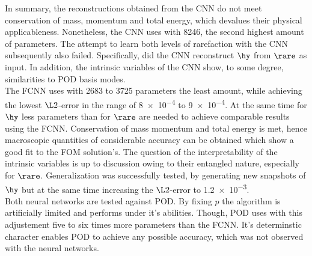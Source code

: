 In summary, the reconstructions obtained from the CNN do not meet conservation of mass, momentum and total energy, which devalues their physical applicableness. Nonetheless, the CNN uses with 8246, the second highest amount of parameters. The attempt to learn both levels of rarefaction with the CNN subsequently also failed. Specifically, did the CNN reconstruct \(\hy\) from \(\rare\) as input. In addition, the intrinsic variables of the CNN show, to some degree, similarities to POD basis modes. \\
The FCNN uses with 2683 to 3725 parameters the least amount, while achieving the lowest \(\L2\)-error in the range of \num{8e-4} to \num{9e-4}. At the same time for \(\hy\) less parameters than for \(\rare\) are needed to achieve comparable results using the FCNN. Conservation of mass momentum and total energy is met, hence macroscopic quantities of considerable accuracy can be obtained which show a good fit to the FOM solution's. The question of the interpretability of the intrinsic variables is up to discussion owing to their entangled nature, especially for \(\rare\). Generalization was successfully tested, by generating new snapshots of \(\hy\) but at the same time increasing the \(\L2\)-error to \num{1.2e-3}.\\
Both neural networks are tested against POD. By fixing \(p\) the algorithm is artificially limited and performs under it's abilities. Though, POD uses with this adjustement five to six times more parameters than the FCNN. It's determinstic character enables POD to achieve any possible accuracy, which was not observed with the neural networks.    
